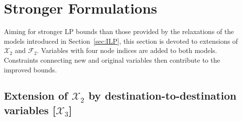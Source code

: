 \section{Stronger Formulations}
\label{sec:strong}

Aiming for stronger LP bounds than those provided by the relaxations of the models introduced in Section\ \ref{sec:ILP},
this section is devoted to extensions of $\mathcal{X}_2$ and $\mathcal{F}_2$.
Variables with four node indices are added to both models.
Constraints connecting new and original variables then contribute to the improved bounds.

\subsection{Extension of $\mathcal{X}_2$ by destination-to-destination variables [$\mathcal{X}_3$]}
\label{sec:smtx3}

